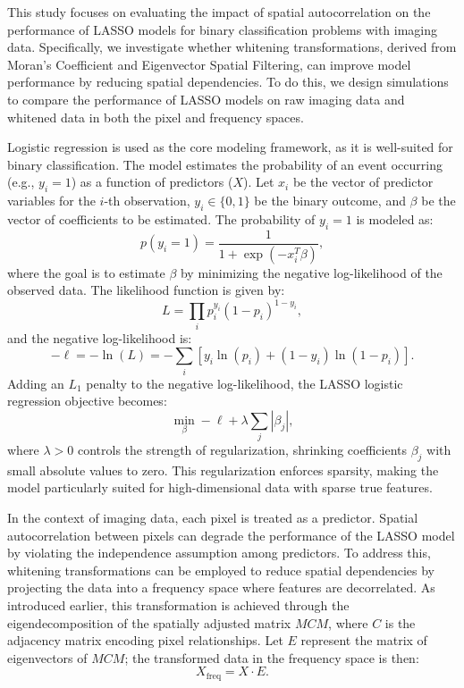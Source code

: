 \documentclass[12pt]{article}
\begin{document}
This study focuses on evaluating the impact of spatial autocorrelation on the performance of LASSO models for binary classification problems with imaging data. Specifically, we investigate whether whitening transformations, derived from Moran’s Coefficient and Eigenvector Spatial Filtering, can improve model performance by reducing spatial dependencies. To do this, we design simulations to compare the performance of LASSO models on raw imaging data and whitened data in both the pixel and frequency spaces.

Logistic regression is used as the core modeling framework, as it is well-suited for binary classification. The model estimates the probability of an event occurring (e.g., \( y_i = 1 \)) as a function of predictors (\( X \)). Let \( x_i \) be the vector of predictor variables for the \( i \)-th observation, \( y_i \in \{0, 1\} \) be the binary outcome, and \( \beta \) be the vector of coefficients to be estimated. The probability of \( y_i = 1 \) is modeled as:
\[
  p(y_i = 1) = \frac{1}{1 + \exp(-x_i^T \beta)},
\]
where the goal is to estimate \( \beta \) by minimizing the negative log-likelihood of the observed data. The likelihood function is given by:
\[
  L = \prod_i p_i^{y_i} (1 - p_i)^{1 - y_i},
\]
and the negative log-likelihood is:
\[
  - \ell = - \ln(L) = - \sum_i \left[ y_i \ln(p_i) + (1 - y_i) \ln(1 - p_i) \right].
\]
Adding an \( L_1 \) penalty to the negative log-likelihood, the LASSO logistic regression objective becomes:
\[
  \min_{\beta} - \ell + \lambda \sum_j |\beta_j|,
\]
where \( \lambda > 0 \) controls the strength of regularization, shrinking coefficients \( \beta_j \) with small absolute values to zero. This regularization enforces sparsity, making the model particularly suited for high-dimensional data with sparse true features.

In the context of imaging data, each pixel is treated as a predictor. Spatial autocorrelation between pixels can degrade the performance of the LASSO model by violating the independence assumption among predictors. To address this, whitening transformations can be employed to reduce spatial dependencies by projecting the data into a frequency space where features are decorrelated. As introduced earlier, this transformation is achieved through the eigendecomposition of the spatially adjusted matrix \( MCM \), where \( C \) is the adjacency matrix encoding pixel relationships. Let \( E \) represent the matrix of eigenvectors of \( MCM \); the transformed data in the frequency space is then:
\[
  X_{\text{freq}} = X \cdot E.
\]
\end{document}
